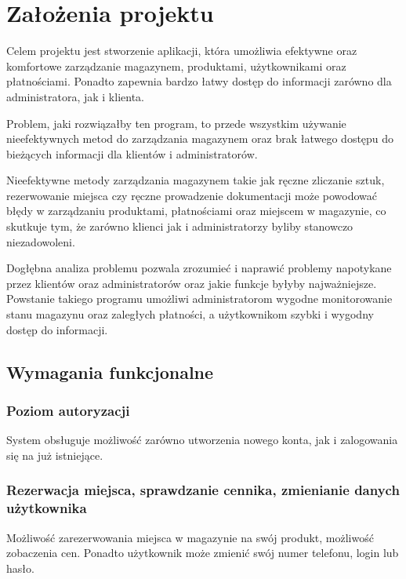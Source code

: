 \chapter{Założenia projektu}
\label{chap:Założenia projektu}

Celem projektu jest stworzenie aplikacji, która umożliwia efektywne oraz komfortowe zarządzanie magazynem, produktami, użytkownikami oraz płatnościami. Ponadto zapewnia bardzo łatwy dostęp do informacji zarówno dla administratora, jak i klienta.

Problem, jaki rozwiązałby ten program, to przede wszystkim używanie nieefektywnych metod do zarządzania magazynem oraz brak łatwego dostępu do bieżących informacji dla klientów i administratorów.

Nieefektywne metody zarządzania magazynem takie jak ręczne zliczanie sztuk, rezerwowanie miejsca czy ręczne prowadzenie dokumentacji może powodować błędy w zarządzaniu produktami, płatnościami oraz miejscem w magazynie, co skutkuje tym, że zarówno klienci jak i administratorzy byliby stanowczo niezadowoleni.

Dogłębna analiza problemu pozwala zrozumieć i naprawić problemy napotykane przez klientów oraz administratorów oraz jakie funkcje byłyby najważniejsze. Powstanie takiego programu umożliwi administratorom wygodne monitorowanie stanu magazynu oraz zaległych płatności, a użytkownikom szybki i wygodny dostęp do informacji.

\section{Wymagania funkcjonalne}
\label{sec:Wymagania funkcjonalne}

\subsection{Poziom autoryzacji}
\label{subsec:Poziom autoryzacji}
System obsługuje możliwość zarówno utworzenia nowego konta, jak i zalogowania się na już istniejące.

\subsection{Rezerwacja miejsca, sprawdzanie cennika, zmienianie danych użytkownika}
\label{subsec:Rezerwacja miejsca, sprawdzanie cennika, zmienianie danych użytkownika}
Możliwość zarezerwowania miejsca w magazynie na swój produkt, możliwość zobaczenia cen. Ponadto użytkownik może zmienić swój numer telefonu, login lub hasło.

